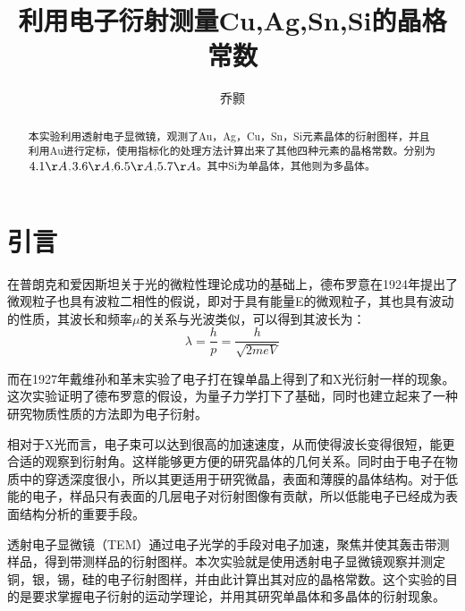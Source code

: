 \documentclass[aps,pre,12pt,preprint,onecolumn,showpacs,showkeys,UTF8]{revtex4-1}
\begin{document}
\title{\bf\heiti{}利用电子衍射测量Cu,Ag,Sn,Si的晶格常数\vspace{15mm}}
\author{\fangsong 乔颢\vspace{2mm}}
\begin{abstract}
	\vspace{10mm}
	\begin{spacing}{1.5}
		\songti{}
		本实验利用透射电子显微镜，观测了Au，Ag，Cu，Sn，Si元素晶体的衍射图样，并且利用Au进行定标，使用指标化的处理方法计算出来了其他四种元素的晶格常数。分别为$4.1\AA$,$3.6\AA$,$6.5\AA$,$5.7\AA$。其中Si为单晶体，其他则为多晶体。
	\end{spacing}
\end{abstract}

\maketitle

\section{引言}
在普朗克和爱因斯坦关于光的微粒性理论成功的基础上，德布罗意在1924年提出了微观粒子也具有波粒二相性的假说，即对于具有能量E的微观粒子，其也具有波动的性质，其波长和频率$\mu$的关系与光波类似，可以得到其波长为：
\begin{equation}
	\lambda=\frac{h}{p}=\frac{h}{\sqrt{2meV}}
\end{equation}

而在1927年戴维孙和革末实验了电子打在镍单晶上得到了和X光衍射一样的现象。这次实验证明了德布罗意的假设，为量子力学打下了基础，同时也建立起来了一种研究物质性质的方法即为电子衍射。

相对于X光而言，电子束可以达到很高的加速速度，从而使得波长变得很短，能更合适的观察到衍射角。这样能够更方便的研究晶体的几何关系。同时由于电子在物质中的穿透深度很小，所以其更适用于研究微晶，表面和薄膜的晶体结构。对于低能的电子，样品只有表面的几层电子对衍射图像有贡献，所以低能电子已经成为表面结构分析的重要手段。

透射电子显微镜（TEM）通过电子光学的手段对电子加速，聚焦并使其轰击带测样品，得到带测样品的衍射图样。本次实验就是使用透射电子显微镜观察并测定铜，银，锡，硅的电子衍射图样，并由此计算出其对应的晶格常数。这个实验的目的是要求掌握电子衍射的运动学理论，并用其研究单晶体和多晶体的衍射现象。\cite{Book}
\end{document}
